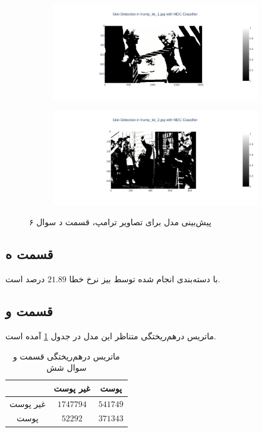 \documentclass{article}
\begin{document}
\begin{figure}[h]
    \begin{subfigure}{.45\linewidth}
        \centering
        \includegraphics[width=\linewidth]{images/q6/trump_partd.png}
    \end{subfigure}
    \hfill
    \begin{subfigure}{.45\linewidth}
        \centering
        \includegraphics[width=\linewidth]{images/q6/trump_partd2.png}
    \end{subfigure}
    \caption{پیش‌بینی مدل  برای تصاویر ترامپ، قسمت د سوال ۶}
    \label{partd-trump-skin}
\end{figure}

\subsection*{قسمت ه}

با دسته‌بندی انجام شده توسط بیز نرخ خطا $21.89$ درصد است.

\subsection*{قسمت و}

ماتریس در‌هم‌ریختگی متناظر این مدل در جدول \ref{partf-confusion-matrix} آمده است.

\begin{table}[h]
    \centering
    \caption{ماتریس درهم‌ریختگی قسمت و سوال شش}
    \label{partf-confusion-matrix}
    \begin{tabular}{c|c|c}
        & غیر پوست & پوست \\
        \hline
        غیر پوست & $1747794$ & $541749$ \\
        پوست & $52292$ & $371343$
    \end{tabular}
\end{table}
\end{document}
